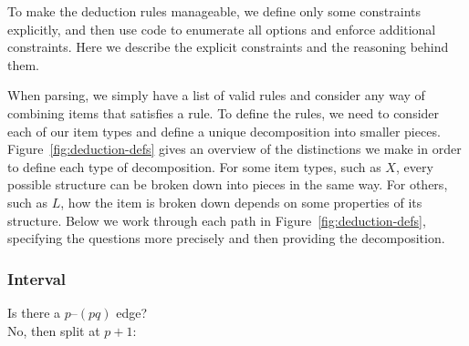 To make the deduction rules manageable, we define only some constraints explicitly, and then use code to enumerate all options and enforce additional constraints.
Here we describe the explicit constraints and the reasoning behind them.

When parsing, we simply have a list of valid rules and consider any way of combining items that satisfies a rule.
To define the rules, we need to consider each of our item types and define a unique decomposition into smaller pieces.
Figure~\ref{fig:deduction-defs} gives an overview of the distinctions we make in order to define each type of decomposition.
For some item types, such as $X$, every possible structure can be broken down into pieces in the same way.
For others, such as $L$, how the item is broken down depends on some properties of its structure.
Below we work through each path in Figure~\ref{fig:deduction-defs}, specifying the questions more precisely and then providing the decomposition.

\subsubsection{Interval}\label{sec:interval}
Is there a $p$--$(pq)$ edge? \\
No, then split at $p+1$: \\

\noindent
\begin{minipage}{\deductionRuleLength}
\centering
\hfill{}\hfill
{}
\end{minipage}
\vspace{5mm}

